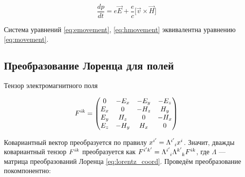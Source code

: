 \documentclass{article}
\begin{document}
\begin{equation}\label{eq:hmovement}
    \frac{dp}{dt}=e\vec{E}+\frac{e}{c}\lbrack\vec{v}\times\vec{H}\rbrack
\end{equation}

Система уравнений \eqref{eq:emovement}, \eqref{eq:hmovement} эквивалентна уравнению \eqref{eq:movement}.

\subsection{Преобразование Лоренца для полей}

Тензор электромагнитного поля

\begin{equation}\label{eq:f_tensor}
    \tensor{F}{^i^k} =
    \begin{pmatrix}
        0 & -E_x & -E_y & -E_z \\
        E_x & 0 & -H_z & H_y \\
        E_y & H_z & 0 & -H_x \\
        E_z & -H_y & H_x & 0
    \end{pmatrix}
\end{equation}

Ковариантный вектор преобразуется по правилу $x^{i'}=\tensor{\Lambda}{^{i'}_{i}} x^i$. Значит, дважды ковариантный тензор $\tensor{F}{^i^k}$ преобразуется как $\tensor{F}{^{i'}^{k'}}=\tensor{\Lambda}{^{i'}_{i}}\tensor{\Lambda}{^{k'}_{k}} \tensor{F}{^i^k}$, где $\Lambda$ --- матрица преобразований Лоренца \eqref{eq:lorentz_coord}. Проведём преобразование покомпонентно:
\end{document}
